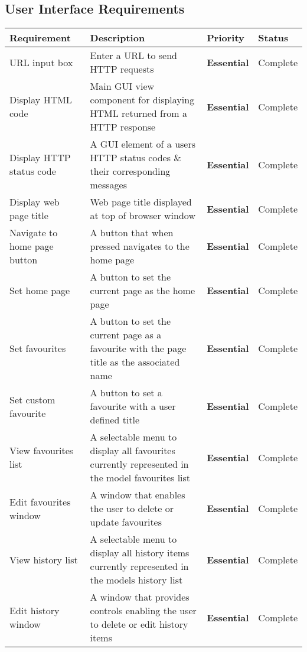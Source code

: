 \documentclass[../Main.tex]{subfiles}
\begin{document}
\subsection{User Interface Requirements}\label{subsec:UIRequirements}
\begin{center}
    \begin{longtable}{|p{3cm}|p{7cm}|l|p{2cm}|}
        \hline
        \textbf{Requirement} & \textbf{Description} & \textbf{Priority} & \textbf{Status}\\
        \hline \endhead
        URL input box & Enter a URL to send HTTP requests & \textbf{Essential} & Complete\\
        \hline
        Display HTML code & Main GUI view component for displaying HTML returned from a HTTP response & \textbf{Essential} & Complete\\
        \hline
        Display HTTP status code & A GUI element of a users HTTP status codes \& their corresponding messages & \textbf{Essential} & Complete\\
        \hline
        Display web page title & Web page title displayed at top of browser window & \textbf{Essential} & Complete\\
        \hline
        Navigate to home page button & A button that when pressed navigates to the home page & \textbf{Essential} & Complete\\
        \hline
        Set home page & A button to set the current page as the home page & \textbf{Essential} & Complete\\
        \hline
        Set favourites & A button to set the current page as a favourite with the page title as the associated name & \textbf{Essential} & Complete\\
        \hline
        Set custom favourite & A button to set a favourite with a user defined title & \textbf{Essential} & Complete\\
        \hline
        View favourites list & A selectable menu to display all favourites currently represented in the model favourites list & \textbf{Essential} & Complete\\
        \hline
        Edit favourites window & A window that enables the user to delete or update favourites & \textbf{Essential} & Complete\\
        \hline
        View history list & A selectable menu to display all history items currently represented in the models history list & \textbf{Essential} & Complete\\
        \hline
        Edit history window & A window that provides controls enabling the user to delete or edit history items & \textbf{Essential} & Complete\\

\end{longtable}
\end{center}
\end{document}
